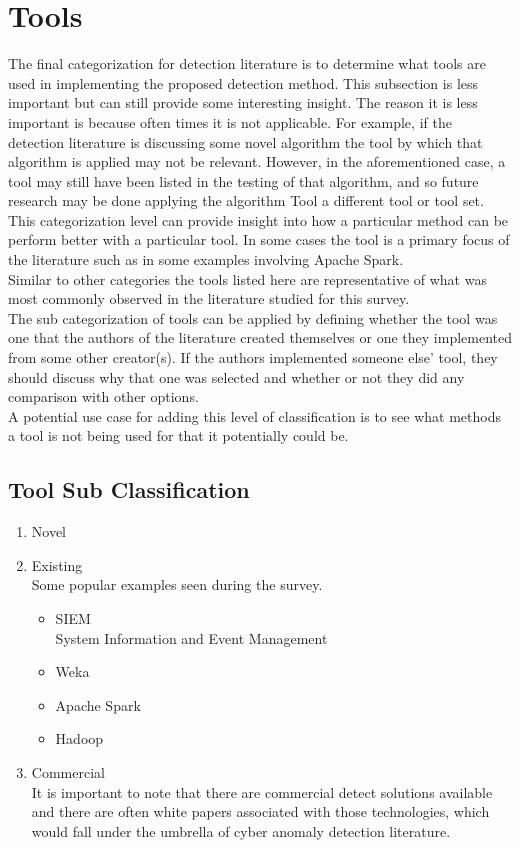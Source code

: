 \documentclass[10pt]{IEEEtran}
\begin{document}
\section{Tools}
The final categorization for detection literature is to determine what tools are used in implementing the proposed detection method. This subsection is less important but can still provide some interesting insight. The reason it is less important is because often times it is not applicable. For example, if the detection literature is discussing some novel algorithm the tool by which that algorithm is applied may not be relevant. However, in the aforementioned case, a tool may still have been listed in the testing of that algorithm, and so future research may be done applying the algorithm Tool a different tool or tool set.\\
This categorization level can provide insight into how a particular method can be perform better with a particular tool. In some cases the tool is a primary focus of the literature such as in some examples involving Apache Spark.\\
Similar to other categories the tools listed here are representative of what was most commonly observed in the literature studied for this survey. \\
The sub categorization of tools can be applied by defining whether the tool was one that the authors of the literature created themselves or one they implemented from some other creator(s). If the authors implemented someone else' tool, they should discuss why that one was selected and whether or not they did any comparison with other options. \\
A potential use case for adding this level of classification is to see what methods a tool is not being used for that it potentially could be.

\subsection{Tool Sub Classification}
\begin{enumerate}
    \item Novel
    \item Existing \\
    Some popular examples seen during the survey.
    \begin{itemize}
        \item SIEM \cite{kotenko2012attack}\\
        System Information and Event Management
        \item Weka \cite{asif2011filtering}\cite{thevar2017effect}
        \item Apache Spark \cite{gupta2016framework}\cite{dobson2018performance}
        \item Hadoop \cite{gupta2014big}\cite{tankard2012big}
    \end{itemize}
    \item Commercial \\
    It is important to note that there are commercial detect solutions available and there are often white papers associated with those technologies, which would fall under the umbrella of cyber anomaly detection literature.
\end{enumerate}
\end{document}
